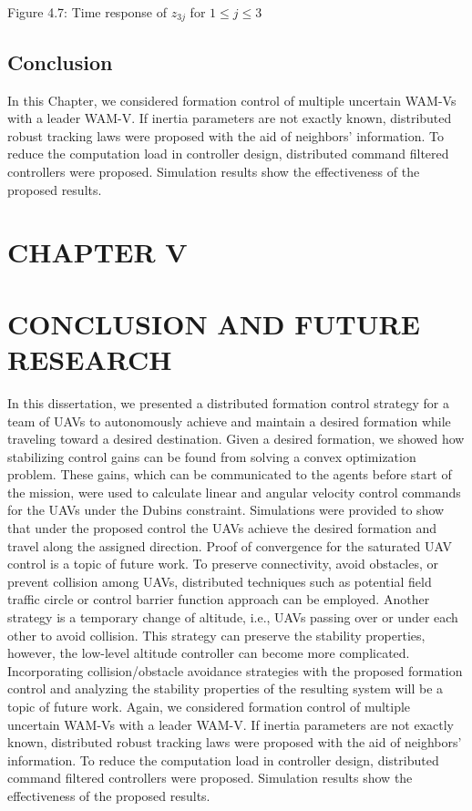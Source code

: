 \documentclass[10pt]{article}
\begin{document}
Figure 4.7: Time response of $z_{3 j}$ for $1 \leq j \leq 3$

\subsection{Conclusion}
In this Chapter, we considered formation control of multiple uncertain WAM-Vs with a leader WAM-V. If inertia parameters are not exactly known, distributed robust tracking laws were proposed with the aid of neighbors' information. To reduce the computation load in controller design, distributed command filtered controllers were proposed. Simulation results show the effectiveness of the proposed results.

\section{CHAPTER V}
\section{CONCLUSION AND FUTURE RESEARCH}
In this dissertation, we presented a distributed formation control strategy for a team of UAVs to autonomously achieve and maintain a desired formation while traveling toward a desired destination. Given a desired formation, we showed how stabilizing control gains can be found from solving a convex optimization problem. These gains, which can be communicated to the agents before start of the mission, were used to calculate linear and angular velocity control commands for the UAVs under the Dubins constraint. Simulations were provided to show that under the proposed control the UAVs achieve the desired formation and travel along the assigned direction. Proof of convergence for the saturated UAV control is a topic of future work. To preserve connectivity, avoid obstacles, or prevent collision among UAVs, distributed techniques such as potential field traffic circle or control barrier function approach can be employed. Another strategy is a temporary change of altitude, i.e., UAVs passing over or under each other to avoid collision. This strategy can preserve the stability properties, however, the low-level altitude controller can become more complicated. Incorporating collision/obstacle avoidance strategies with the proposed formation control and analyzing the stability properties of the resulting system will be a topic of future work. Again, we considered formation control of multiple uncertain WAM-Vs with a leader WAM-V. If inertia parameters are not exactly known, distributed robust tracking laws were proposed with the aid of neighbors' information. To reduce the computation load in controller design, distributed command filtered controllers were proposed. Simulation results show the effectiveness of the proposed results.
\end{document}
